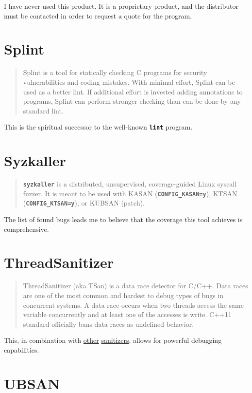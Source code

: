 \documentclass[12pt]{article}
\let\mytexttt\texttt%
\renewcommand\texttt[1]{\textbf{\mytexttt{#1}}}
\begin{document}
I have never used this product. It is a proprietary product, and the
distributor must be contacted in order to request a quote for the program.
\cite{cpptest}
\section{Splint}

\begin{quote}
Splint is a tool for statically checking C programs for security
vulnerabilities and coding mistakes. With minimal effort, Splint can
be used as a better lint. If additional effort is invested adding
annotations to programs, Splint can perform stronger checking than
can be done by any standard lint.
\end{quote}

This is the spiritual successor to the well-known \texttt{lint} program.
\cite{splint}
\section{Syzkaller}

\begin{quote}
\texttt{syzkaller} is a distributed, unsupervised, coverage-guided Linux syscall
fuzzer. It is meant to be used with KASAN (\texttt{CONFIG\_KASAN=y}), KTSAN
(\texttt{CONFIG\_KTSAN=y}), or KUBSAN (patch).
\end{quote}

The list of found bugs leads me to believe that the coverage this tool
achieves is comprehensive.
\cite{syzkaller}
\section{ThreadSanitizer}

\begin{quote}
ThreadSanitizer (aka TSan) is a data race detector for C/C++. Data
races are one of the most common and hardest to debug types of bugs
in concurrent systems. A data race occurs when two threads access
the same variable concurrently and at least one of the accesses
is write. C++11 standard officially bans data races as undefined
behavior.
\end{quote}

\label{tsan}
This, in combination with \hyperref[asan]{other} \hyperref[msan]{sanitizers},
allows for powerful debugging capabilities.
\cite{tsan}
\section{UBSAN}
\end{document}
